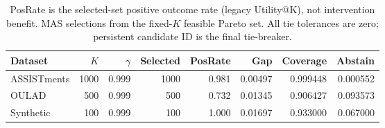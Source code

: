 \begin{table}[t]
\centering
\small
\caption{PosRate is the selected-set positive outcome rate (legacy Utility@K), not intervention benefit. MAS selections from the fixed-$K$ feasible Pareto set. All tie tolerances are zero; persistent candidate ID is the final tie-breaker.}
\label{tab:recovered}
\begin{tabular}{lrrrrrrr}
\toprule
Dataset & $K$ & $\gamma$ & Selected & PosRate & Gap & Coverage & Abstain \\
\midrule
ASSISTments & 1000 & 0.999 & 1000 & 0.981 & 0.00497 & 0.999448 & 0.000552 \\
OULAD & 500 & 0.999 & 500 & 0.732 & 0.01345 & 0.906427 & 0.093573 \\
Synthetic & 100 & 0.999 & 100 & 1.000 & 0.01697 & 0.933000 & 0.067000 \\
\bottomrule
\end{tabular}
\end{table}
